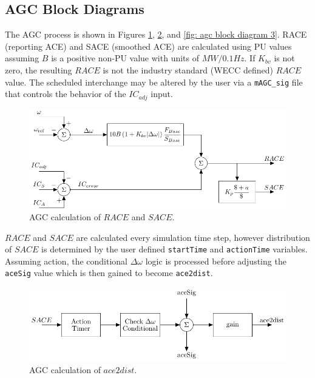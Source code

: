 \subsection{AGC Block Diagrams}
The AGC process is shown in Figures \ref{fig: agc block diagram 1}, \ref{fig: agc block diagram 2}, and \ref{fig: agc block diagram 3}.
RACE (reporting ACE) and SACE (smoothed ACE) are calculated using PU values assuming $B$ is a positive non-PU value with units of $MW/0.1Hz$.
If $K_{bv}$ is not zero, the resulting $RACE$ is not the industry standard (WECC defined) $RACE$ value.
The scheduled interchange may be altered by the user via a \verb|mAGC_sig| file that controls the behavior of the $IC_{adj}$ input.


\begin{figure}[!h]
	\centering
	\footnotesize
	\includegraphics[width=\linewidth]{sections/agc/200722-AGCblockdiagram-p1}
	\caption{AGC calculation of $RACE$ and $SACE$.}
	\label{fig: agc block diagram 1}
\end{figure}%

\pagebreak
$RACE$ and $SACE$ are calculated every simulation time step, however
distribution of $SACE$ is determined by the user defined \verb|startTime| and \verb|actionTime| variables.
Assuming action, the conditional $\Delta\omega$ logic is processed before adjusting the \verb|aceSig| value which is then gained to become \verb|ace2dist|.

\begin{figure}[!h]
	\centering
	\footnotesize
	\includegraphics[width=\linewidth]{sections/agc/200722-AGCblockdiagram-p2}
	\caption{AGC calculation of $ace2dist$.}
	\label{fig: agc block diagram 2}
\end{figure}%

